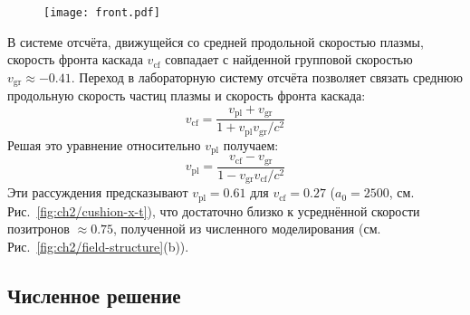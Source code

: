 \begin{figure}[h!]
	\texttt{[image: front.pdf]}
    \caption{\label{front} }
\end{figure}

В системе отсчёта, движущейся со средней продольной скоростью плазмы, скорость фронта каскада $v_\mathrm{cf}$ совпадает с найденной групповой скоростью $v_\mathrm{gr} \approx -0.41$.
Переход в лабораторную систему отсчёта позволяет связать среднюю продольную скорость частиц плазмы и скорость фронта каскада:
\begin{equation}
    v_\mathrm{cf}=\frac{v_\mathrm{pl}+v_\mathrm{gr}}{1+ v_\mathrm{pl} v_\mathrm{gr} /c^2} 
\label{vcf}
\end{equation}
Решая это уравнение относительно $v_\mathrm{pl}$ получаем:
\begin{equation}
    \label{vpl}
    v_\mathrm{pl}=\frac{v_\mathrm{cf}-v_\mathrm{gr}}{1-v_\mathrm{gr}v_\mathrm{cf}/c^2} 
\end{equation}
Эти рассуждения предсказывают $v_\mathrm{pl}=0.61$ для $v_\mathrm{cf} = 0.27$ ($a_{0}=2500$, см. Рис.~\ref{fig:ch2/cushion-x-t}), что достаточно близко к усреднённой скорости позитронов $\approx 0.75$, полученной из численного моделирования (см. Рис.~\ref{fig:ch2/field-structure}(b)).

\subsection{Численное решение}
\label{sub:ch2/sec3/Numeric}

